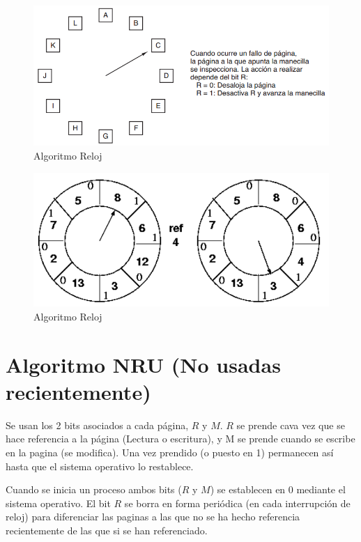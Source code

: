 \documentclass{article}
\begin{document}
\begin{figure}[H]
	\centering
	\includegraphics[scale=0.7]{img/reloj.png}
	\caption{Algoritmo Reloj}
\end{figure}

\begin{figure}[H]
	\centering
	\includegraphics[scale=0.7]{img/reloj2.png}
	\caption{Algoritmo Reloj}
\end{figure}


{\centering \section*{Algoritmo NRU (No usadas recientemente)}}
Se usan los 2 bits asociados a cada página, $R$ y $M$. $R$ se prende cava vez que se hace referencia a la página (Lectura o escritura), y M se prende cuando se escribe en la pagina (se modifica). Una vez prendido (o puesto en 1) permanecen así hasta que el sistema operativo lo restablece.

Cuando se inicia un proceso ambos bits ($R$ y $M$) se establecen en 0 mediante el sistema operativo. El bit $R$ se borra en forma periódica (en cada interrupción de reloj) para diferenciar las paginas a las que no se ha hecho referencia recientemente de las que si se han referenciado.
\end{document}

